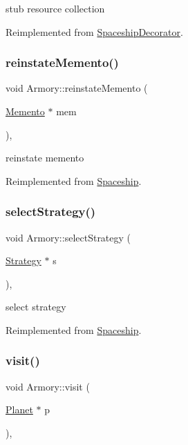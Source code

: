 stub resource collection 

Reimplemented from \hyperlink{classSpaceshipDecorator_a5ee7a9a8c146c85f08591e47d971dce7}{Spaceship\+Decorator}.

\mbox{\label{classArmory_ad4027c724be016da41eeac5aaab2238b}} 
\subsubsection{\texorpdfstring{reinstate\+Memento()}{reinstateMemento()}}
{\footnotesize\ttfamily void Armory\+::reinstate\+Memento (\begin{DoxyParamCaption}\item[{\hyperlink{classMemento}{Memento} $\ast$}]{mem }\end{DoxyParamCaption})\hspace{0.3cm}{\ttfamily [inline]}, {\ttfamily [virtual]}}

reinstate memento 

Reimplemented from \hyperlink{classSpaceship_ab075c869473344b6471c8e28ca7ea61e}{Spaceship}.

\mbox{\label{classArmory_a85d472873bf4ce934c849f7c362f7064}} 
\subsubsection{\texorpdfstring{select\+Strategy()}{selectStrategy()}}
{\footnotesize\ttfamily void Armory\+::select\+Strategy (\begin{DoxyParamCaption}\item[{\hyperlink{classStrategy}{Strategy} $\ast$}]{s }\end{DoxyParamCaption})\hspace{0.3cm}{\ttfamily [inline]}, {\ttfamily [virtual]}}

select strategy 

Reimplemented from \hyperlink{classSpaceship_a93be2d9d2b675ef978d866d4cd7a6524}{Spaceship}.

\mbox{\label{classArmory_a76e105e23137e82f67e752ff13f52d75}} 
\subsubsection{\texorpdfstring{visit()}{visit()}}
{\footnotesize\ttfamily void Armory\+::visit (\begin{DoxyParamCaption}\item[{\hyperlink{classPlanet}{Planet} $\ast$}]{p }\end{DoxyParamCaption})\hspace{0.3cm}{\ttfamily [inline]}, {\ttfamily [virtual]}}

